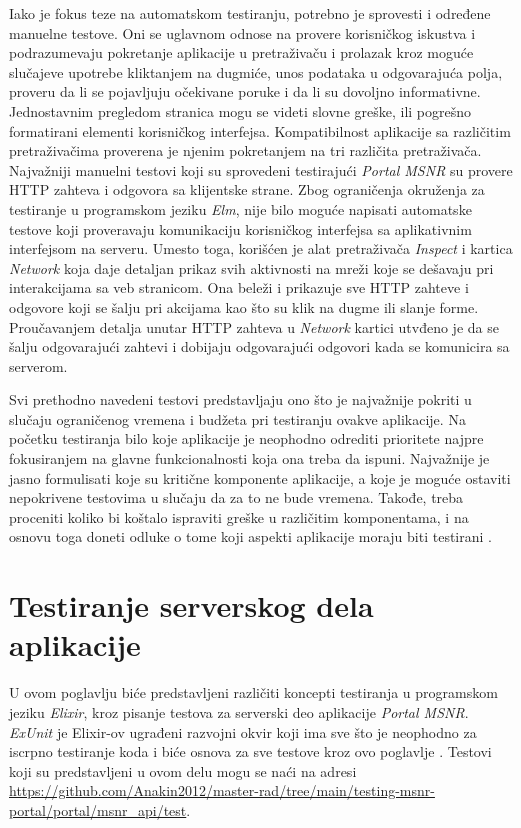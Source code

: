 \documentclass[12pt,oneside]{memoir}
\begin{document}
\par Iako je fokus teze na automatskom testiranju, potrebno je sprovesti i određene manuelne testove. Oni se uglavnom odnose na provere korisničkog iskustva i podrazumevaju pokretanje aplikacije u pretraživaču i prolazak kroz moguće slučajeve upotrebe kliktanjem na dugmiće, unos podataka u odgovarajuća polja, proveru da li se pojavljuju očekivane poruke i da li su dovoljno informativne. Jednostavnim pregledom stranica mogu se videti slovne greške, ili pogrešno formatirani elementi korisničkog interfejsa. Kompatibilnost aplikacije sa različitim pretraživačima proverena je njenim pokretanjem na tri različita pretraživača. Najvažniji manuelni testovi koji su sprovedeni testirajući \emph{Portal MSNR} su provere HTTP zahteva i odgovora sa klijentske strane. Zbog ograničenja okruženja za testiranje u programskom jeziku \emph{Elm}, nije bilo moguće napisati automatske testove koji proveravaju komunikaciju korisničkog interfejsa sa aplikativnim interfejsom na serveru. Umesto toga, korišćen je alat pretraživača \emph{Inspect} i kartica \emph{Network} koja daje detaljan prikaz svih aktivnosti na mreži koje se dešavaju pri interakcijama sa veb stranicom. Ona beleži i prikazuje sve HTTP zahteve i odgovore koji se šalju pri akcijama kao što su klik na dugme ili slanje forme. Proučavanjem detalja unutar HTTP zahteva u \emph{Network} kartici utvđeno je da se šalju odgovarajući zahtevi i dobijaju odgovarajući odgovori kada se komunicira sa serverom.
\par Svi prethodno navedeni testovi predstavljaju ono što je najvažnije pokriti u slučaju ograničenog vremena i budžeta pri testiranju ovakve aplikacije. Na početku testiranja bilo koje aplikacije je neophodno odrediti prioritete najpre fokusiranjem na glavne funkcionalnosti koja ona treba da ispuni. Najvažnije je jasno formulisati koje su kritične komponente aplikacije, a koje je moguće ostaviti nepokrivene testovima u slučaju da za to ne bude vremena. Takođe, treba proceniti koliko bi koštalo ispraviti greške u različitim komponentama, i na osnovu toga doneti odluke o tome koji aspekti aplikacije moraju biti testirani \cite{stlc, est}.

\chapter{Testiranje serverskog dela aplikacije}
\label{chp:elixir}

\par U ovom poglavlju biće predstavljeni različiti koncepti testiranja u programskom jeziku \emph{Elixir}, kroz pisanje testova za serverski deo aplikacije \emph{Portal MSNR}. \textit{ExUnit} je Elixir-ov ugrađeni razvojni okvir koji ima sve što je neophodno za iscrpno testiranje koda i biće osnova za sve testove kroz ovo poglavlje \cite{exunit}. Testovi koji su predstavljeni u ovom delu mogu se naći na adresi \url{https://github.com/Anakin2012/master-rad/tree/main/testing-msnr-portal/portal/msnr_api/test}.
\end{document}
